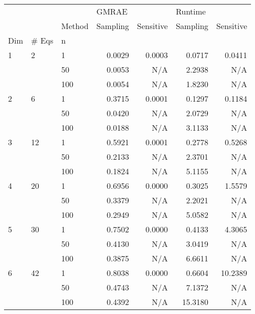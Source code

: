 \begin{tabular}{lllrrrr}
\toprule
  &    & {} & \multicolumn{2}{l}{GMRAE} & \multicolumn{2}{l}{Runtime} \\
  &    & Method & Sampling & Sensitive & Sampling & Sensitive \\
Dim & \# Eqs & n &          &           &          &           \\
\midrule
1 & 2  & 1   &   0.0029 &    0.0003 &   0.0717 &    0.0411 \\
  &    & 50  &   0.0053 &       N/A &   2.2938 &       N/A \\
  &    & 100 &   0.0054 &       N/A &   1.8230 &       N/A \\
2 & 6  & 1   &   0.3715 &    0.0001 &   0.1297 &    0.1184 \\
  &    & 50  &   0.0420 &       N/A &   2.0729 &       N/A \\
  &    & 100 &   0.0188 &       N/A &   3.1133 &       N/A \\
3 & 12 & 1   &   0.5921 &    0.0001 &   0.2778 &    0.5268 \\
  &    & 50  &   0.2133 &       N/A &   2.3701 &       N/A \\
  &    & 100 &   0.1824 &       N/A &   5.1155 &       N/A \\
4 & 20 & 1   &   0.6956 &    0.0000 &   0.3025 &    1.5579 \\
  &    & 50  &   0.3379 &       N/A &   2.2021 &       N/A \\
  &    & 100 &   0.2949 &       N/A &   5.0582 &       N/A \\
5 & 30 & 1   &   0.7502 &    0.0000 &   0.4133 &    4.3065 \\
  &    & 50  &   0.4130 &       N/A &   3.0419 &       N/A \\
  &    & 100 &   0.3875 &       N/A &   6.6611 &       N/A \\
6 & 42 & 1   &   0.8038 &    0.0000 &   0.6604 &   10.2389 \\
  &    & 50  &   0.4743 &       N/A &   7.1372 &       N/A \\
  &    & 100 &   0.4392 &       N/A &  15.3180 &       N/A \\
\bottomrule
\end{tabular}
